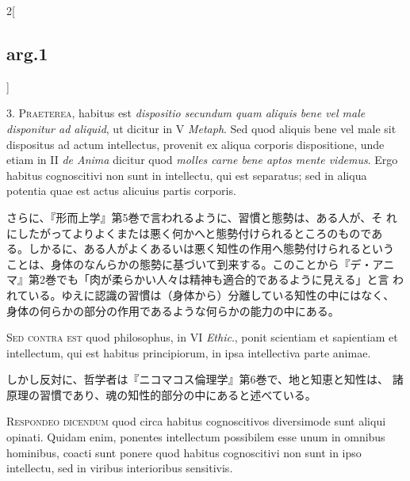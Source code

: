 \documentclass[paper=a4paper,fontsize=10pt,jafontsize=9pt,titlepage]{jlreq}
\begin{document}
\begin{paracol}{2}[\subsection{arg.1}]

3. {\scshape Praeterea}, habitus est {\itshape dispositio secundum quam aliquis
bene vel male disponitur ad aliquid}, ut dicitur in V {\itshape Metaph}. Sed quod
aliquis bene vel male sit dispositus ad actum intellectus, provenit ex
aliqua corporis dispositione, unde etiam in II {\itshape de Anima} dicitur quod
{\itshape molles carne bene aptos mente videmus}. Ergo habitus cognoscitivi non
sunt in intellectu, qui est separatus; sed in aliqua potentia quae est
actus alicuius partis corporis.

\switchcolumn

さらに、『形而上学』第5巻で言われるように、習慣と態勢は、ある人が、そ
れにしたがってよりよくまたは悪く何かへと態勢付けられるところのものであ
る。しかるに、ある人がよくあるいは悪く知性の作用へ態勢付けられるという
ことは、身体のなんらかの態勢に基づいて到来する。このことから『デ・アニ
マ』第2巻でも「肉が柔らかい人々は精神も適合的であるように見える」と言
われている。ゆえに認識の習慣は（身体から）分離している知性の中にはなく、
身体の何らかの部分の作用であるような何らかの能力の中にある。

\switchcolumn*[\subsection{s.c.}]

{\scshape Sed contra est} quod philosophus, in VI {\itshape Ethic}., ponit scientiam et
 sapientiam et intellectum, qui est habitus principiorum, in ipsa
 intellectiva parte animae.

\switchcolumn

しかし反対に、哲学者は『ニコマコス倫理学』第6巻で、地と知恵と知性は、
諸原理の習慣であり、魂の知性的部分の中にあると述べている。


{\scshape Respondeo dicendum} quod circa habitus cognoscitivos diversimode sunt
 aliqui opinati. Quidam enim, ponentes intellectum possibilem esse
 unum in omnibus hominibus, coacti sunt ponere quod habitus
 cognoscitivi non sunt in ipso intellectu, sed in viribus interioribus
 sensitivis.


\end{paracol}
\end{document}
